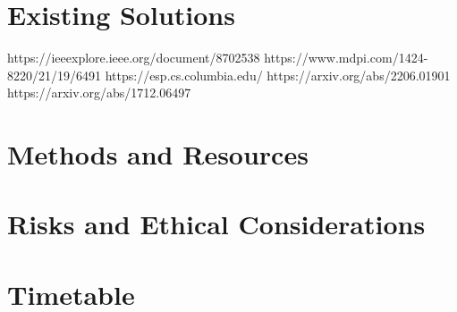 \documentclass[a4paper,fleqn,12pt]{article}
\begin{document}
\section{Existing Solutions}
https://ieeexplore.ieee.org/document/8702538
https://www.mdpi.com/1424-8220/21/19/6491
https://esp.cs.columbia.edu/
https://arxiv.org/abs/2206.01901
https://arxiv.org/abs/1712.06497


\section{Methods and Resources}


\section{Risks and Ethical Considerations}

\section{Timetable}

% 
% 
% 
% 



\end{document}
